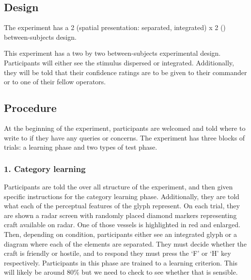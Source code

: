 \documentclass[doc, a4paper, apacite]{apa6}
\begin{document}
\subsection{Design}
The experiment has a 2 (spatial presentation: separated, integrated) x 2 () between-subjects design. 



This experiment has a two by two between-subjects experimental design. 
Participants will either see the stimulus dispersed or integrated. 
Additionally, they will be told that their confidence ratings are to be given to their commander or to one of their fellow operators. 

\subsection{Procedure}
At the beginning of the experiment, participants are welcomed and told where to write to if they have any queries or concerns. 
The experiment has three blocks of trials: a learning phase and two types of test phase. 

\subsubsection{1. Category learning} 
Participants are told the over all structure of the experiment, and then given specific instructions for the category learning phase. 
Additionally, they are told what each of the perceptual features of the glyph represent. 
On each trial, they are shown a radar screen with randomly placed diamond markers representing craft available on radar. 
One of those vessels is highlighted in red and enlarged. 
Then, depending on condition, participants either see an integrated glyph or a diagram where each of the elements are separated. 
They must decide whether the craft is friendly or hostile, and to respond they must press the `F' or `H' key respectively. 
Participants in this phase are trained to a learning criterion. 
This will likely be around 80\% but we need to check to see whether that is sensible. 





\clearpage
\newpage


\end{document}
